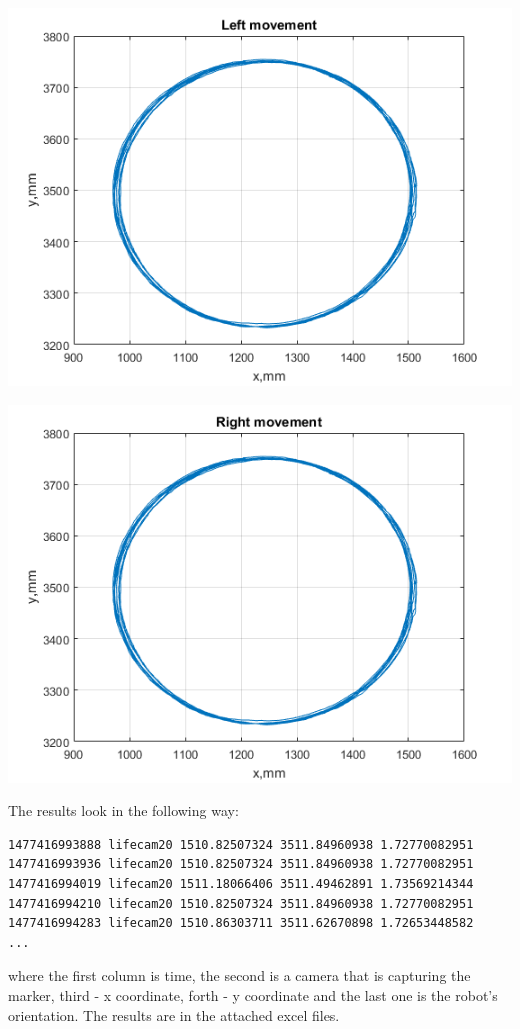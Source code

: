 \documentclass[a4paper, 12pt]{article}
\begin{document}
\begin{center}
  \includegraphics[scale = 0.8]{ll.png}
  
  \includegraphics[scale = 0.8]{rr.png}
\end{center}

The results look in the following way:

\begin{lstlisting}
1477416993888 lifecam20 1510.82507324 3511.84960938 1.72770082951
1477416993936 lifecam20 1510.82507324 3511.84960938 1.72770082951
1477416994019 lifecam20 1511.18066406 3511.49462891 1.73569214344
1477416994210 lifecam20 1510.82507324 3511.84960938 1.72770082951
1477416994283 lifecam20 1510.86303711 3511.62670898 1.72653448582
...
\end{lstlisting}
where the first column is time, the second is a camera that is capturing the marker, third - x coordinate, forth - y coordinate and the last one is the robot's orientation. The results are in the attached excel files.
\end{document}
